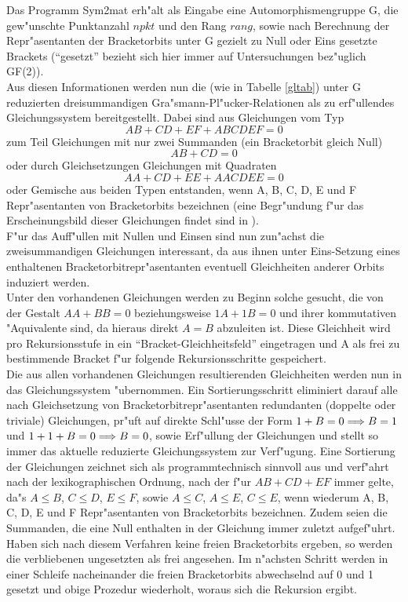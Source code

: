 Das Programm {\sc Sym2mat} erh"alt als Eingabe eine Automorphismengruppe G,
die gew"unschte Punktanzahl $npkt$ und den Rang $rang$, sowie nach Berechnung
der Repr"asentanten der Bracketorbits unter G gezielt zu Null oder Eins
gesetzte Brackets ("`gesetzt"' bezieht sich hier immer auf Untersuchungen
bez"uglich GF(2)).\\
Aus diesen Informationen werden nun die (wie in Tabelle \ref{gltab}) unter G
reduzierten dreisummandigen Gra"smann-Pl"ucker-Relationen als zu erf"ullendes
Gleichungssystem bereitgestellt. Dabei sind aus Gleichungen vom Typ
$$AB + CD + EF + ABCDEF = 0$$
zum Teil Gleichungen mit nur zwei Summanden (ein Bracketorbit gleich Null)
$$AB + CD = 0$$
oder durch Gleichsetzungen Gleichungen mit Quadraten
$$AA + CD + EE + AACDEE = 0$$
oder Gemische aus beiden Typen entstanden, wenn A, B, C, D, E und F
Repr"asentanten von Bracketorbits bezeichnen (eine Begr"undung f"ur das
Erscheinungsbild dieser Gleichungen findet sind in \cite{BoOlRi:91}).\\
F"ur das Auff"ullen mit Nullen und Einsen sind nun zun"achst die
zweisummandigen Gleichungen interessant, da aus ihnen unter Eins-Setzung
eines enthaltenen Bracketorbit\-repr"asentanten eventuell Gleichheiten anderer
Orbits induziert werden.\\
Unter den vorhandenen Gleichungen werden zu Beginn solche gesucht, die von der
Gestalt $AA + BB = 0$ beziehungsweise $1A + 1B = 0$ und ihrer kommutativen
"Aquivalente sind, da hieraus direkt $A = B$ abzuleiten ist. Diese Gleichheit
wird pro Rekursionsstufe in ein "`Bracket-Gleichheitsfeld"' eingetragen und A
als frei zu bestimmende Bracket f"ur folgende Rekursionsschritte gespeichert.\\
Die aus allen vorhandenen Gleichungen resultierenden Gleichheiten werden nun
in das Gleichungssystem "ubernommen. Ein Sortierungsschritt eliminiert darauf
alle nach Gleichsetzung von Bracketorbitrepr"asentanten redundanten (doppelte
oder triviale) Gleichungen, pr"uft auf direkte Schl"usse der Form
$1 + B = 0 \Longrightarrow B = 1$ und $1 + 1 + B = 0\Longrightarrow B = 0$, sowie Erf"ullung
der Gleichungen und stellt so immer das aktuelle reduzierte Gleichungssystem
zur Verf"ugung. Eine Sortierung der Gleichungen zeichnet sich als
programmtechnisch sinnvoll aus und verf"ahrt nach der lexikographischen Ordnung,
nach der f"ur $AB + CD + EF$ immer gelte, da"s $A\leq B$, $C\leq D$, $E\leq F$,
sowie $A\leq C$, $A\leq E$, $C\leq E$, wenn wiederum A, B, C, D, E und F
Repr"asentanten von Bracketorbits bezeichnen. Zudem seien die Summanden, die
eine Null enthalten in der Gleichung immer zuletzt aufgef"uhrt.\\
Haben sich nach diesem Verfahren keine freien Bracketorbits ergeben, so werden
die verbliebenen ungesetzten als frei angesehen. Im n"achsten Schritt
werden in einer Schleife nacheinander die freien Bracketorbits abwechselnd auf
0 und 1 gesetzt und obige Prozedur wiederholt, woraus sich die Rekursion ergibt.

